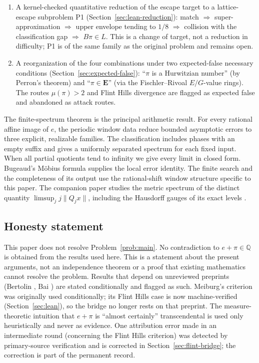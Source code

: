 \documentclass[11pt]{amsart}
\theoremstyle{definition}
\theoremstyle{remark}
\numberwithin{equation}{section}
\newcommand{\Q}{\mathbb{Q}}
\newcommand{\irr}{\mu}
\begin{document}
\begin{enumerate}
\item A kernel-checked quantitative reduction of the escape target to a lattice-escape subproblem P1 (Section~\ref{sec:lean-reduction}): match $\Rightarrow$ super-approximation $\Rightarrow$ upper envelope tending to $1/8$ $\Rightarrow$ collision with the classification gap $\Rightarrow$ $B\pi\in L$. This is a change of target, not a reduction in difficulty; P1 is of the same family as the original problem and remains open.
\item A reorganization of the four combinations under two expected-false necessary conditions (Section~\ref{sec:expected-false}): ``$\pi$ is a Hurwitzian number'' (by Perron's theorem) and ``$\pi\in\mathbf{E}$'' (via the Fischler--Rivoal $E/G$-value rings). The routes $\irr(\pi)>2$ and Flint Hills divergence are flagged as expected false and abandoned as attack routes.
\end{enumerate}

The finite-spectrum theorem is the principal arithmetic result. For
every rational affine image of $e$, the periodic window data reduce
bounded asymptotic errors to three explicit, realizable families. The
classification includes phases with an empty suffix and gives a uniformly
separated spectrum for each fixed input. When all partial quotients
tend to infinity we give every limit in closed form. Bugeaud's M\"obius formula
\cite[eq.~(3.4)]{BugeaudQuad} supplies the local error identity. The finite
search and the completeness of its output use the rational-shift window
structure specific to this paper. The companion paper studies the metric
spectrum of the distinct quantity $\limsup_j j\|Q_jx\|$, including the
Hausdorff gauges of its exact levels \cite{CompanionGauge}.

\subsection{Honesty statement} This paper does not resolve Problem~\ref{prob:main}. No contradiction to $e+\pi\in\Q$ is obtained from the results used here. This is a statement about the present arguments, not an independence theorem or a proof that existing mathematics cannot resolve the problem. Results that depend on unreviewed preprints (Bertolin \cite{Bertolin2026}, Bai \cite{Bai2026}) are stated conditionally and flagged as such. Meiburg's criterion \cite{Meiburg2022} was originally used conditionally; its Flint Hills case is now machine-verified (Section~\ref{sec:lean}), so the bridge no longer rests on that preprint. The measure-theoretic intuition that $e+\pi$ is ``almost certainly'' transcendental is used only heuristically and never as evidence. One attribution error made in an intermediate round (concerning the Flint Hills criterion) was detected by primary-source verification and is corrected in Section~\ref{sec:flint-bridge}; the correction is part of the permanent record.
\end{document}
